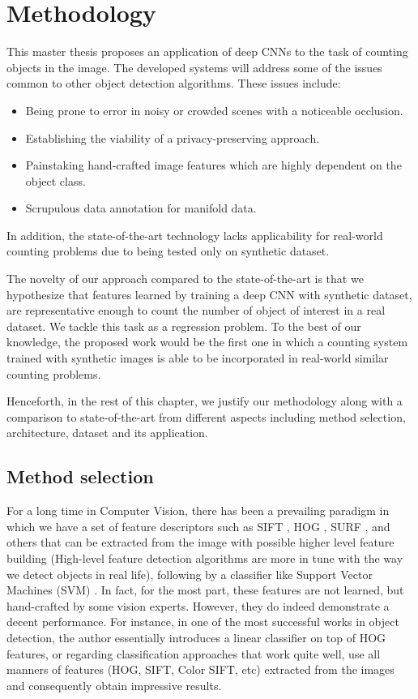 \newpage
\chapter{Methodology}
\label{sec:proposal}
\noindent
This master thesis proposes an application of deep CNNs to the task of counting objects in the image. The developed systems will address some of the issues common to other object detection algorithms. These issues include:
\begin{itemize}
	\item Being prone to error in noisy or crowded scenes with a noticeable occlusion. 
	\item Establishing the viability of a privacy-preserving approach. 
	\item Painstaking hand-crafted image features which are highly dependent on the object class. 
	\item Scrupulous data annotation for manifold data. 
\end{itemize} 
In addition, the state-of-the-art \cite{segui2015learning} technology lacks applicability for real-world counting problems due to being tested only on synthetic dataset.

The novelty of our approach compared to the state-of-the-art is that we hypothesize that features learned by training a  deep CNN with synthetic dataset, are representative enough to count the number of object of interest in a real dataset. We tackle this task as a regression problem. 
To the best of our knowledge, the proposed work would be the first one in which a counting system trained with synthetic images is able to be incorporated in real-world similar counting problems.

Henceforth, in the rest of this chapter, we justify our methodology along with a comparison to state-of-the-art from different aspects including method selection, architecture, dataset and its application.   


\section{Method selection}

For a long time in Computer Vision, there has been a prevailing paradigm in which we have a set of feature descriptors such as SIFT \cite{lowe1999object}, HOG \cite{dalal2005histograms}, SURF \cite{bay2006surf}, and others that can be extracted from the image with possible higher level feature building (High-level feature detection algorithms are more in tune with the way we detect objects in real life), following by a classifier like Support Vector Machines (SVM) \cite{vapnik1964note, boser1992training}. In fact, for the most part, these features are not learned, but hand-crafted by some vision experts. However, they do indeed demonstrate a decent performance. For instance, in one of the most successful works in object detection\cite{felzenszwalb2010object}, the author essentially introduces a linear classifier on top of HOG features, or regarding classification approaches that work quite well, \citeauthor{yu2010object} use all manners of features (HOG, SIFT, Color SIFT, etc) extracted from the images and consequently obtain impressive results. 

